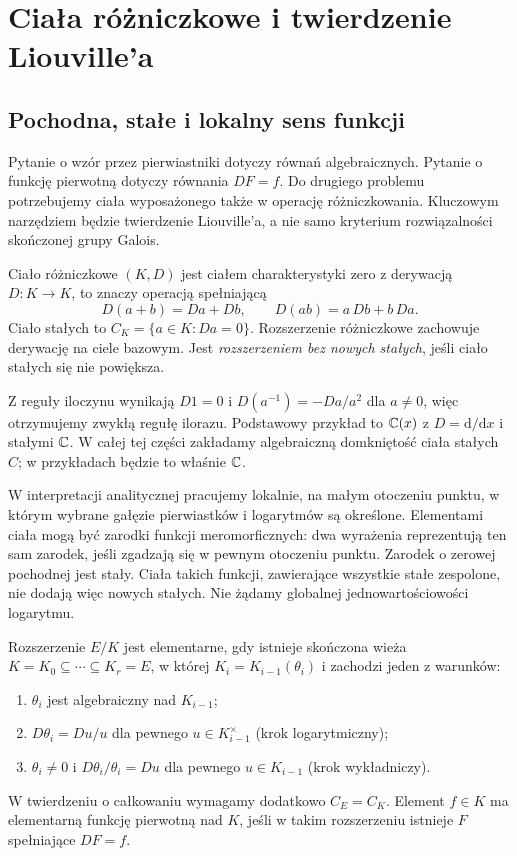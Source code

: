 \chapter{Ciała różniczkowe i twierdzenie Liouville'a}

\section{Pochodna, stałe i lokalny sens funkcji}

Pytanie o wzór przez pierwiastniki dotyczy równań algebraicznych. Pytanie o funkcję pierwotną dotyczy równania $DF=f$. Do drugiego problemu potrzebujemy ciała wyposażonego także w operację różniczkowania. Kluczowym narzędziem będzie twierdzenie Liouville'a, a nie samo kryterium rozwiązalności skończonej grupy Galois.

\begin{definicja}
Ciało różniczkowe $(K,D)$ jest ciałem charakterystyki zero z derywacją $D:K\to K$, to znaczy operacją spełniającą
\[
D(a+b)=Da+Db,\qquad D(ab)=a\,Db+b\,Da.
\]
Ciało stałych to $C_K=\{a\in K:Da=0\}$. Rozszerzenie różniczkowe zachowuje derywację na ciele bazowym. Jest \emph{rozszerzeniem bez nowych stałych}, jeśli ciało stałych się nie powiększa.
\end{definicja}

Z reguły iloczynu wynikają $D1=0$ i $D(a^{-1})=-Da/a^2$ dla $a\ne0$, więc otrzymujemy zwykłą regułę ilorazu. Podstawowy przykład to $\mathbb{C}(x)$ z $D=\mathrm{d}/\mathrm{d}x$ i stałymi $\mathbb{C}$. W całej tej części zakładamy algebraiczną domkniętość ciała stałych $C$; w przykładach będzie to właśnie $\mathbb{C}$.

W interpretacji analitycznej pracujemy lokalnie, na małym otoczeniu punktu, w którym wybrane gałęzie pierwiastków i logarytmów są określone. Elementami ciała mogą być zarodki funkcji meromorficznych: dwa wyrażenia reprezentują ten sam zarodek, jeśli zgadzają się w pewnym otoczeniu punktu. Zarodek o zerowej pochodnej jest stały. Ciała takich funkcji, zawierające wszystkie stałe zespolone, nie dodają więc nowych stałych. Nie żądamy globalnej jednowartościowości logarytmu.

\begin{definicja}
Rozszerzenie $E/K$ jest elementarne, gdy istnieje skończona wieża $K=K_0\subseteq\cdots\subseteq K_r=E$, w której $K_i=K_{i-1}(\theta_i)$ i zachodzi jeden z warunków:
\begin{enumerate}
\item $\theta_i$ jest algebraiczny nad $K_{i-1}$;
\item $D\theta_i=Du/u$ dla pewnego $u\in K_{i-1}^\times$ (krok logarytmiczny);
\item $\theta_i\ne0$ i $D\theta_i/\theta_i=Du$ dla pewnego $u\in K_{i-1}$ (krok wykładniczy).
\end{enumerate}
W twierdzeniu o całkowaniu wymagamy dodatkowo $C_E=C_K$. Element $f\in K$ ma elementarną funkcję pierwotną nad $K$, jeśli w takim rozszerzeniu istnieje $F$ spełniające $DF=f$.
\end{definicja}

